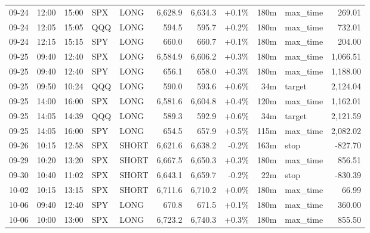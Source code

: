 \documentclass[11pt,a4paper,twoside]{article}
\begin{document}
\begin{center}
\begin{longtable}{>{\color{txtmain}}l l l l l r r r r >{\color{txtmain}}l r}
09-24 & 12:00 & 15:00 & SPX & LONG & 6,628.9 & 6,634.3 & \textcolor{wingreen}{+0.1\%} & 180m & max\_time & \textcolor{wingreen}{269.01} \\
09-24 & 12:05 & 15:05 & QQQ & LONG & 594.5 & 595.7 & \textcolor{wingreen}{+0.2\%} & 180m & max\_time & \textcolor{wingreen}{732.01} \\
09-24 & 12:15 & 15:15 & SPY & LONG & 660.0 & 660.7 & \textcolor{wingreen}{+0.1\%} & 180m & max\_time & \textcolor{wingreen}{204.00} \\
09-25 & 09:40 & 12:40 & SPX & LONG & 6,584.9 & 6,606.2 & \textcolor{wingreen}{+0.3\%} & 180m & max\_time & \textcolor{wingreen}{1,066.51} \\
09-25 & 09:40 & 12:40 & SPY & LONG & 656.1 & 658.0 & \textcolor{wingreen}{+0.3\%} & 180m & max\_time & \textcolor{wingreen}{1,188.00} \\
09-25 & 09:50 & 10:24 & QQQ & LONG & 590.0 & 593.6 & \textcolor{wingreen}{+0.6\%} & 34m & target & \textcolor{wingreen}{2,124.04} \\
09-25 & 14:00 & 16:00 & SPX & LONG & 6,581.6 & 6,604.8 & \textcolor{wingreen}{+0.4\%} & 120m & max\_time & \textcolor{wingreen}{1,162.01} \\
09-25 & 14:05 & 14:39 & QQQ & LONG & 589.3 & 592.9 & \textcolor{wingreen}{+0.6\%} & 34m & target & \textcolor{wingreen}{2,121.59} \\
09-25 & 14:05 & 16:00 & SPY & LONG & 654.5 & 657.9 & \textcolor{wingreen}{+0.5\%} & 115m & max\_time & \textcolor{wingreen}{2,082.02} \\
09-26 & 10:15 & 12:58 & SPX & SHORT & 6,621.6 & 6,638.2 & \textcolor{lossred}{-0.2\%} & 163m & stop & \textcolor{lossred}{-827.70} \\
09-29 & 10:20 & 13:20 & SPX & SHORT & 6,667.5 & 6,650.3 & \textcolor{wingreen}{+0.3\%} & 180m & max\_time & \textcolor{wingreen}{856.51} \\
09-30 & 10:40 & 11:02 & SPX & SHORT & 6,643.1 & 6,659.7 & \textcolor{lossred}{-0.2\%} & 22m & stop & \textcolor{lossred}{-830.39} \\
10-02 & 10:15 & 13:15 & SPX & SHORT & 6,711.6 & 6,710.2 & \textcolor{wingreen}{+0.0\%} & 180m & max\_time & \textcolor{wingreen}{66.99} \\
10-06 & 09:40 & 12:40 & SPY & LONG & 670.8 & 671.5 & \textcolor{wingreen}{+0.1\%} & 180m & max\_time & \textcolor{wingreen}{360.00} \\
10-06 & 10:00 & 13:00 & SPX & LONG & 6,723.2 & 6,740.3 & \textcolor{wingreen}{+0.3\%} & 180m & max\_time & \textcolor{wingreen}{855.50} \\

\end{longtable}
\end{center}
\end{document}
